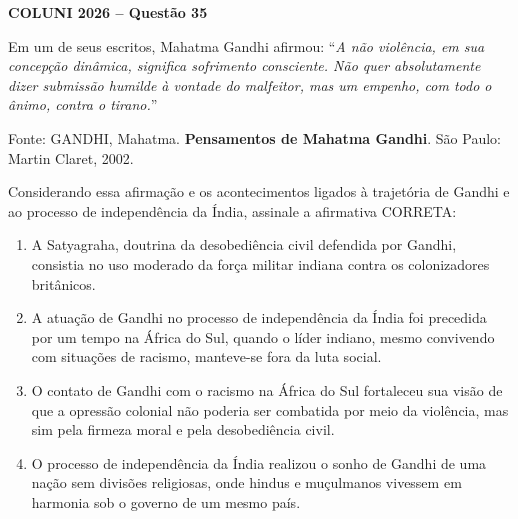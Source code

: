 \textbf{COLUNI 2026 -- Questão 35}\par\medskip Em um de seus escritos, Mahatma Gandhi afirmou: “\textit{A não violência, em sua concepção dinâmica, significa sofrimento consciente. Não quer absolutamente dizer submissão humilde à vontade do malfeitor, mas um empenho, com todo o ânimo, contra o tirano.}”\par
Fonte: GANDHI, Mahatma. \textbf{Pensamentos de Mahatma Gandhi}. São Paulo: Martin Claret, 2002.

Considerando essa afirmação e os acontecimentos ligados à trajetória de Gandhi e ao processo de independência da Índia, assinale a afirmativa CORRETA:\begin{enumerate}
\item A Satyagraha, doutrina da desobediência civil defendida por Gandhi, consistia no uso moderado da força militar indiana contra os colonizadores britânicos.
\item A atuação de Gandhi no processo de independência da Índia foi precedida por um tempo na África do Sul, quando o líder indiano, mesmo convivendo com situações de racismo, manteve-se fora da luta social.
\item O contato de Gandhi com o racismo na África do Sul fortaleceu sua visão de que a opressão colonial não poderia ser combatida por meio da violência, mas sim pela firmeza moral e pela desobediência civil.
\item O processo de independência da Índia realizou o sonho de Gandhi de uma nação sem divisões religiosas, onde hindus e muçulmanos vivessem em harmonia sob o governo de um mesmo país.\end{enumerate}